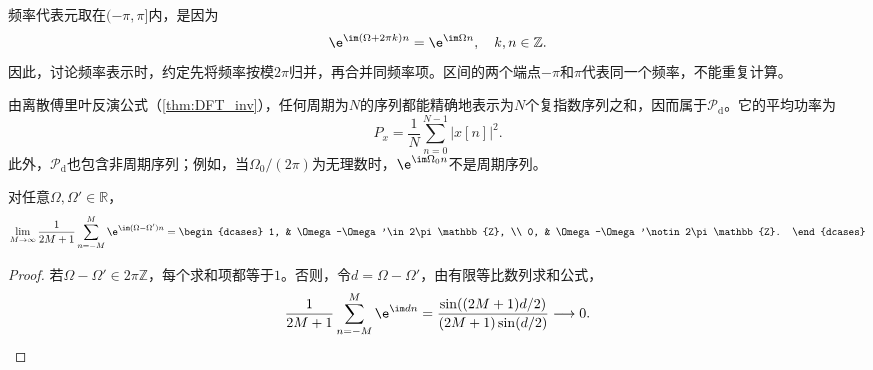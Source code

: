 频率代表元取在$(-\pi,\pi]$内，是因为
\begin{equation}
    \e^{\im(\Omega+2\pi k)n}=\e^{\im\Omega n},\quad k,n\in\mathbb{Z}.
\end{equation}
因此，讨论频率表示时，约定先将频率按模$2\pi$归并，再合并同频率项。区间的两个端点$-\pi$和$\pi$代表同一个频率，不能重复计算。

由离散傅里叶反演公式（\cref{thm:DFT_inv}），任何周期为$N$的序列都能精确地表示为$N$个复指数序列之和，因而属于$\mathcal{P}_{\mathrm d}$。它的平均功率为
\begin{equation}
    P_x=\frac{1}{N}\sum_{n=0}^{N-1}|x[n]|^2.
\end{equation}
此外，$\mathcal{P}_{\mathrm d}$也包含非周期序列；例如，当$\Omega_0/(2\pi)$为无理数时，$\e^{\im\Omega_0 n}$不是周期序列。

\begin{proposition}[离散复指数的平均正交性]
    对任意$\Omega,\Omega'\in\mathbb{R}$，
    \begin{equation}
        \lim_{M\to\infty}\frac{1}{2M+1}\sum_{n=-M}^{M}\e^{\im(\Omega-\Omega')n}=
        \begin{dcases}
            1, & \Omega-\Omega'\in 2\pi\mathbb{Z},    \\
            0, & \Omega-\Omega'\notin 2\pi\mathbb{Z}.
        \end{dcases}
    \end{equation}
\end{proposition}
\begin{proof}
    若$\Omega-\Omega'\in 2\pi\mathbb{Z}$，每个求和项都等于$1$。否则，令$d=\Omega-\Omega'$，由有限等比数列求和公式，
    \begin{equation}
        \frac{1}{2M+1}\sum_{n=-M}^{M}\e^{\im dn}=\frac{\sin((2M+1)d/2)}{(2M+1)\sin(d/2)}\longrightarrow 0.
    \end{equation}
\end{proof}

